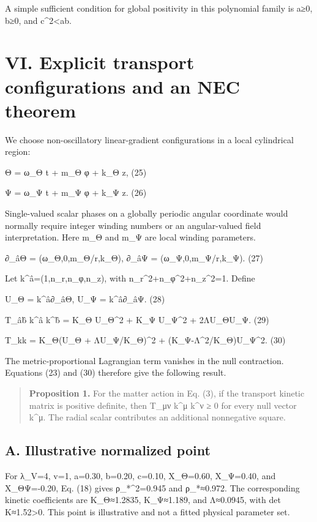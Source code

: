 A simple sufficient condition for global positivity in this polynomial
family is a≥0, b≥0, and c\^{}2\textless ab.

\section{VI. Explicit transport configurations and an NEC
theorem}\label{vi.-explicit-transport-configurations-and-an-nec-theorem}

We choose non-oscillatory linear-gradient configurations in a local
cylindrical region:

Θ = ω\_Θ t + m\_Θ φ + k\_Θ z, (25)

Ψ = ω\_Ψ t + m\_Ψ φ + k\_Ψ z. (26)

Single-valued scalar phases on a globally periodic angular coordinate
would normally require integer winding numbers or an angular-valued
field interpretation. Here m\_Θ and m\_Ψ are local winding parameters.

∂\_âΘ = (ω\_Θ,0,m\_Θ/r,k\_Θ), ∂\_âΨ = (ω\_Ψ,0,m\_Ψ/r,k\_Ψ). (27)

Let k\^{}â=(1,n\_r,n\_φ,n\_z), with n\_r\^{}2+n\_φ\^{}2+n\_z\^{}2=1.
Define

U\_Θ = k\^{}â∂\_âΘ, U\_Ψ = k\^{}â∂\_âΨ. (28)

T\_âb̂ k\^{}â k\^{}b̂ = K\_Θ U\_Θ\^{}2 + K\_Ψ U\_Ψ\^{}2 + 2ΛU\_ΘU\_Ψ. (29)

T\_kk = K\_Θ(U\_Θ + ΛU\_Ψ/K\_Θ)\^{}2 + (K\_Ψ-Λ\^{}2/K\_Θ)U\_Ψ\^{}2. (30)

The metric-proportional Lagrangian term vanishes in the null
contraction. Equations (23) and (30) therefore give the following
result.

\begin{quote}
\textbf{Proposition 1.} For the matter action in Eq. (3), if the
transport kinetic matrix is positive definite, then T\_μν k\^{}μ k\^{}ν
≥ 0 for every null vector k\^{}μ. The radial scalar contributes an
additional nonnegative square.
\end{quote}

\subsection{A. Illustrative normalized
point}\label{a.-illustrative-normalized-point}

For λ\_V=4, v=1, a=0.30, b=0.20, c=0.10, X\_Θ=0.60, X\_Ψ=0.40, and
X\_ΘΨ=-0.20, Eq. (18) gives ρ\_*\^{}2=0.945 and ρ\_*≈0.972. The
corresponding kinetic coefficients are K\_Θ≈1.2835, K\_Ψ≈1.189, and
Λ≈0.0945, with det K≈1.52\textgreater0. This point is illustrative and
not a fitted physical parameter set.

